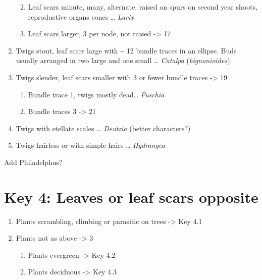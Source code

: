 \documentclass[openany]{book}
\providecommand{\tightlist}{%
  \setlength{\itemsep}{0pt}\setlength{\parskip}{0pt}}
\begin{document}
\begin{enumerate}
  \begin{enumerate}
  \def\labelenumii{\arabic{enumii}.}
  \setcounter{enumii}{14}
  \tightlist
  \item
    Leaf scars minute, many, alternate, raised on spurs on second year shoots,
    reproductive organs cones \ldots{} \emph{Larix}
  \item
    Leaf scars larger, 3 per node, not raised -\textgreater{} 17
  \end{enumerate}
\item
  Twigs stout, leaf scars large with \textasciitilde{} 12 bundle traces in an ellipse. Buds usually arranged in two large and one small \ldots{} \emph{Catalpa} (\emph{bignonioides})
\item
  Twigs slender, leaf scars smaller with 3 or fewer bundle traces -\textgreater{} 19

  \begin{enumerate}
  \def\labelenumii{\arabic{enumii}.}
  \setcounter{enumii}{18}
  \tightlist
  \item
    Bundle trace 1, twigs mostly dead\ldots{} \emph{Fuschia}
  \item
    Bundle traces 3 -\textgreater{} 21
  \end{enumerate}
\item
  Twigs with stellate scales \ldots{} \emph{Deutzia} (better characters?)
\item
  Twigs hairless or with simple hairs \ldots{} \emph{Hydrangea}
\end{enumerate}

Add Philadelphus?

\hypertarget{key-4-leaves-or-leaf-scars-opposite}{%
\chapter*{Key 4: Leaves or leaf scars opposite}\label{key-4-leaves-or-leaf-scars-opposite}}

\begin{enumerate}
\def\labelenumi{\arabic{enumi}.}
\tightlist
\item
  Plants scrambling, climbing or parasitic on trees -\textgreater{} Key 4.1
\item
  Plants not as above -\textgreater{} 3

  \begin{enumerate}
  \def\labelenumii{\arabic{enumii}.}
  \setcounter{enumii}{2}
  \tightlist
  \item
    Plants evergreen -\textgreater{} Key 4.2
  \item
    Plants deciduous -\textgreater{} Key 4.3
  \end{enumerate}
\end{enumerate}
\end{document}
